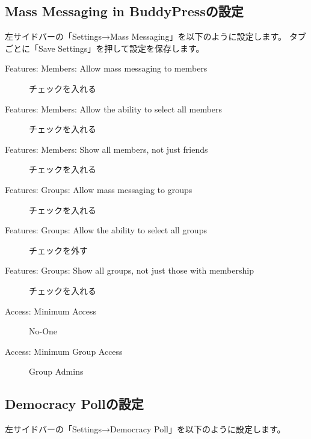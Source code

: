 \documentclass[titlepage,10pt,a4paper,uplatex]{jsbook}
\begin{document}
\subsection{Mass Messaging in BuddyPressの設定}

左サイドバーの「Settings→Mass Messaging」を以下のように設定します。
タブごとに「Save Settings」を押して設定を保存します。

\begin{description}
\item[Features: Members: Allow mass messaging to members] チェックを入れる
\item[Features: Members: Allow the ability to select all members] チェックを入れる
\item[Features: Members: Show all members, not just friends] チェックを入れる
\item[Features: Groups: Allow mass messaging to groups] チェックを入れる
\item[Features: Groups: Allow the ability to select all groups] チェックを外す
\item[Features: Groups: Show all groups, not just those with membership] チェックを入れる
\item[Access: Minimum Access] No-One
\item[Access: Minimum Group Access] Group Admins
\end{description}

\subsection{Democracy Pollの設定}

左サイドバーの「Settings→Democracy Poll」を以下のように設定します。
\end{document}
